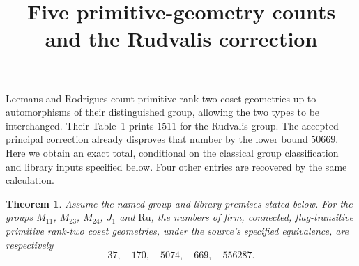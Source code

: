 \documentclass[11pt]{article}
\title{Five primitive-geometry counts and the Rudvalis correction}
\author{}\date{}
\newtheorem{theorem}{Theorem}
\begin{document}
\maketitle
Leemans and Rodrigues \cite{LR} count primitive rank-two coset geometries
up to automorphisms of their distinguished group, allowing the two types
to be interchanged. Their Table~1 prints $1511$ for the Rudvalis group.
The accepted principal correction already disproves that number by the
lower bound $50669$. Here we obtain an exact total, conditional on the
classical group classification and library inputs specified below. Four
other entries are recovered by the same calculation.

\begin{theorem}
Assume the named group and library premises stated below. For
the groups $M_{11}$, $M_{23}$, $M_{24}$, $J_1$ and $\mathrm{Ru}$, the numbers of firm,
connected, flag-transitive primitive rank-two coset geometries, under the
source's specified equivalence, are respectively
\[
                  37,\quad170,\quad5074,\quad669,\quad556287.
\]
\end{theorem}
\end{document}
